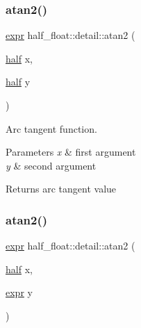 \mbox{\label{namespacehalf__float_1_1detail_a85003efe03f71ec6c069237612a2f84f}} 
\subsubsection{\texorpdfstring{atan2()}{atan2()}\hspace{0.1cm}{\footnotesize\ttfamily [1/4]}}
{\footnotesize\ttfamily \hyperlink{structhalf__float_1_1detail_1_1expr}{expr} half\+\_\+float\+::detail\+::atan2 (\begin{DoxyParamCaption}\item[{\hyperlink{classhalf__float_1_1half}{half}}]{x,  }\item[{\hyperlink{classhalf__float_1_1half}{half}}]{y }\end{DoxyParamCaption})\hspace{0.3cm}{\ttfamily [inline]}}

Arc tangent function. 
\begin{DoxyParams}{Parameters}
{\em x} & first argument \\
\hline
{\em y} & second argument \\
\hline
\end{DoxyParams}
\begin{DoxyReturn}{Returns}
arc tangent value 
\end{DoxyReturn}
\mbox{\label{namespacehalf__float_1_1detail_a8e10018401784e57520350cf5ebf0ee2}} 
\subsubsection{\texorpdfstring{atan2()}{atan2()}\hspace{0.1cm}{\footnotesize\ttfamily [2/4]}}
{\footnotesize\ttfamily \hyperlink{structhalf__float_1_1detail_1_1expr}{expr} half\+\_\+float\+::detail\+::atan2 (\begin{DoxyParamCaption}\item[{\hyperlink{classhalf__float_1_1half}{half}}]{x,  }\item[{\hyperlink{structhalf__float_1_1detail_1_1expr}{expr}}]{y }\end{DoxyParamCaption})\hspace{0.3cm}{\ttfamily [inline]}}

